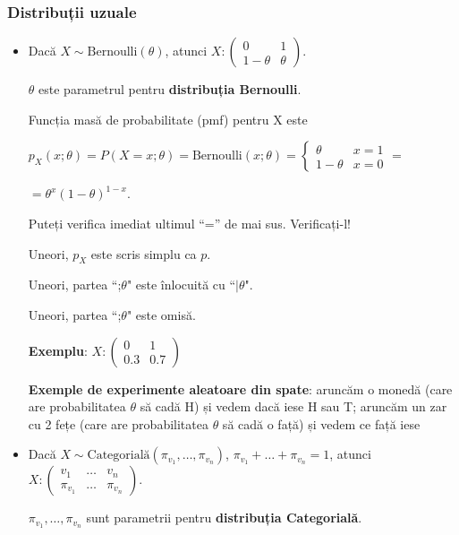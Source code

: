 \documentclass[12pt]{article}
\begin{document}
	\subsubsection{Distribuții uzuale}
	\begin{itemize}
		\item 	Dacă $X \sim \text{Bernoulli}(\theta)$, atunci $X: \begin{pmatrix}
		0 & 1\\
		1-\theta & \theta
		\end{pmatrix}$. 
		
		$\theta$ este parametrul pentru \textbf{distribuția Bernoulli}. 
		
		Funcția masă de probabilitate (pmf) pentru X este 
		
		$p_X(x;\theta) = P(X = x;\theta) = \text{Bernoulli}(x;\theta) = \begin{cases}
		\theta & x = 1\\
		1-\theta & x=0
		\end{cases} =$
		
		$= \theta^x (1-\theta)^{1-x}.$
		
		Puteți verifica imediat ultimul ``='' de mai sus. Verificați-l!
		
		Uneori, $p_X$ este scris simplu ca $p$. 
		
		Uneori, partea ``;$\theta$" este înlocuită cu ``$|\theta$".
		
		Uneori, partea ``;$\theta$" este omisă. 
		
		\textbf{Exemplu}: $X: \begin{pmatrix}
		0 & 1\\
		0.3 & 0.7
		\end{pmatrix}$
		
		\textbf{Exemple de experimente aleatoare din spate}: aruncăm o monedă (care are probabilitatea $\theta$ să cadă H) și vedem dacă iese H sau T; aruncăm un zar cu 2 fețe (care are probabilitatea $\theta$ să cadă o față) și vedem ce față iese
		
		\item 	Dacă $X \sim \text{Categorială}(\pi_{v_1},\dots,\pi_{v_n})$, $\pi_{v_1}+\dots+\pi_{v_n} = 1$, atunci $X:\begin{pmatrix}
		v_1 & \dots & v_n\\
		\pi_{v_1} & \dots & \pi_{v_n}
		\end{pmatrix}$. 
		
		$\pi_{v_1},\dots,\pi_{v_n}$ sunt parametrii pentru \textbf{distribuția Categorială}. 
		

\end{itemize}
\end{document}
